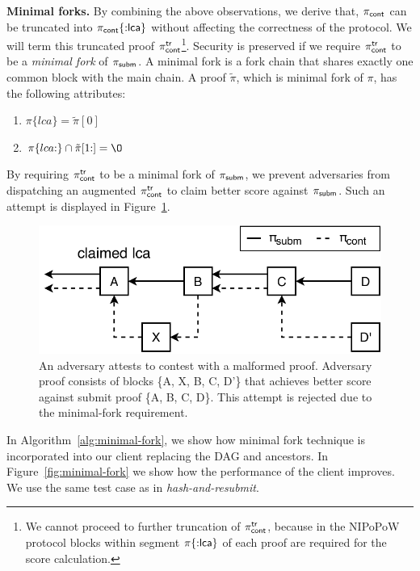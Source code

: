 \noindent \textbf{Minimal forks.} By combining the above observations, we
derive that, $\mathsf{\pi_{cont}}$ can be truncated into $\mathsf{\pi_{cont}}\{{:}\mathsf{lca}\}$ without
affecting the correctness of the protocol. We will term this truncated proof
$\mathsf{\pi_{cont}^{tr}}$\footnote{We cannot proceed to further truncation of $\mathsf{\pi_{cont}^{tr}}$, because
in the NIPoPoW protocol blocks within segment $\pi\{{:}\mathsf{lca}\}$ of each proof
are required for the score calculation.}. Security is preserved if we require
$\mathsf{\pi_{cont}^{tr}}$ to be a \emph{minimal fork} of $\mathsf{\pi_{subm}}$. A minimal fork is a fork chain
that shares exactly one common block with the main chain. A proof $\tilde\pi$,
which is minimal fork of $\pi$, has the following attributes:

\begin{enumerate}
\item $\pi\{lca\} = \tilde\pi[0]$
\item $\pi\{lca{:}\} \cap \tilde\pi[1{:}] = \O$
\end{enumerate}

By requiring $\mathsf{\pi_{cont}^{tr}}$ to be a minimal fork of $\mathsf{\pi_{subm}}$, we prevent adversaries
from dispatching an augmented $\mathsf{\pi_{cont}^{tr}}$ to claim better score against $\mathsf{\pi_{subm}}$.
Such an attempt is displayed in Figure~\ref{fig:adversary-minimal-fork}.

\begin{figure}[h]
    \begin{center}
        \includegraphics[width=0.7\columnwidth]{figures/adversary-minimal-fork.pdf}
    \end{center}

    \caption{An adversary attests to contest with a malformed proof. Adversary
        proof consists of blocks \{A, X, B, C, D'\} that achieves better score
        against submit proof \{A, B, C, D\}. This attempt is rejected due to
        the minimal-fork requirement.}

    \label{fig:adversary-minimal-fork}
\end{figure}

In Algorithm~\ref{alg:minimal-fork}, we show how minimal fork technique is
incorporated into our client replacing the DAG and ancestors. In
Figure~\ref{fig:minimal-fork} we show how the performance of the client
improves. We use the same test case as in \emph{hash-and-resubmit}.


